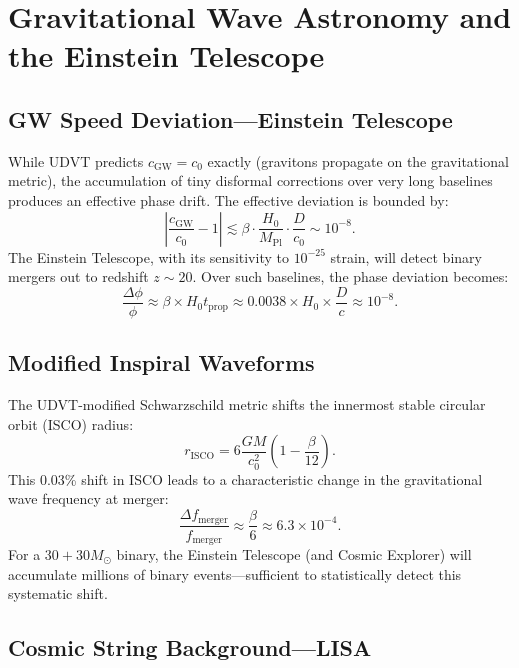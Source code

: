 \documentclass[12pt,a4paper]{book}
\theoremstyle{definition}
\theoremstyle{remark}
\begin{document}
\chapter{Gravitational Wave Astronomy and the Einstein Telescope}
\label{ch:gw}

\section{GW Speed Deviation---Einstein Telescope}

While UDVT predicts $c_{\mathrm{GW}} = c_0$ exactly (gravitons propagate on the gravitational metric), the accumulation of tiny disformal corrections over very long baselines produces an effective phase drift. The effective deviation is bounded by:
\begin{equation}
    \left|\frac{c_{\mathrm{GW}}}{c_0} - 1\right| \lesssim \beta \cdot \frac{H_0}{M_{\mathrm{Pl}}} \cdot \frac{D}{c_0} \sim 10^{-8}.
\end{equation}
The Einstein Telescope, with its sensitivity to $10^{-25}$ strain, will detect binary mergers out to redshift $z \sim 20$. Over such baselines, the phase deviation becomes:
\begin{equation}
    \frac{\Delta\phi}{\phi} \approx \beta \times H_0 t_{\mathrm{prop}} \approx 0.0038 \times H_0 \times \frac{D}{c} \approx 10^{-8}.
\end{equation}

\section{Modified Inspiral Waveforms}

The UDVT-modified Schwarzschild metric shifts the innermost stable circular orbit (ISCO) radius:
\begin{equation}
    r_{\mathrm{ISCO}} = 6\frac{GM}{c_0^2}\left(1 - \frac{\beta}{12}\right).
\end{equation}
This 0.03\% shift in ISCO leads to a characteristic change in the gravitational wave frequency at merger:
\begin{equation}
    \frac{\Delta f_{\mathrm{merger}}}{f_{\mathrm{merger}}} \approx \frac{\beta}{6} \approx 6.3 \times 10^{-4}.
\end{equation}
For a $30+30 M_\odot$ binary, the Einstein Telescope (and Cosmic Explorer) will accumulate millions of binary events---sufficient to statistically detect this systematic shift.

\section{Cosmic String Background---LISA}
\end{document}
